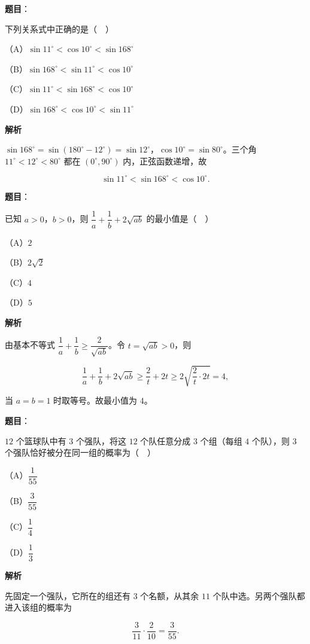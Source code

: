 \begin{answer}

\textbf{题目}：

下列关系式中正确的是（　）

（A）$\sin11^\circ<\cos10^\circ<\sin168^\circ$

（B）$\sin168^\circ<\sin11^\circ<\cos10^\circ$

（C）$\sin11^\circ<\sin168^\circ<\cos10^\circ$

（D）$\sin168^\circ<\cos10^\circ<\sin11^\circ$

\textbf{解析}

$\sin168^\circ=\sin(180^\circ-12^\circ)=\sin12^\circ$，$\cos10^\circ=\sin80^\circ$。三个角 $11^\circ<12^\circ<80^\circ$ 都在 $(0^\circ,90^\circ)$ 内，正弦函数递增，故

\nopagebreak[4]
\[\sin11^\circ<\sin168^\circ<\cos10^\circ.\]


\end{answer}
\begin{answer}

\textbf{题目}：

已知 $a>0$，$b>0$，则 $\dfrac1a+\dfrac1b+2\sqrt{ab}$ 的最小值是（　）

（A）$2$

（B）$2\sqrt2$

（C）$4$

（D）$5$

\textbf{解析}

由基本不等式 $\dfrac1a+\dfrac1b\geqslant\dfrac2{\sqrt{ab}}$。令 $t=\sqrt{ab}>0$，则

\nopagebreak[4]
\[\frac1a+\frac1b+2\sqrt{ab}\geqslant\frac2t+2t\geqslant2\sqrt{\frac2t\cdot2t}=4,\]

当 $a=b=1$ 时取等号。故最小值为 $4$。


\end{answer}
\begin{answer}

\textbf{题目}：

$12$ 个篮球队中有 $3$ 个强队，将这 $12$ 个队任意分成 $3$ 个组（每组 $4$ 个队），则 $3$ 个强队恰好被分在同一组的概率为（　）

（A）$\dfrac1{55}$

（B）$\dfrac3{55}$

（C）$\dfrac14$

（D）$\dfrac13$

\textbf{解析}

先固定一个强队，它所在的组还有 $3$ 个名额，从其余 $11$ 个队中选。另两个强队都进入该组的概率为

\nopagebreak[4]
\[\frac3{11}\cdot\frac2{10}=\frac3{55}.\]


\end{answer}
